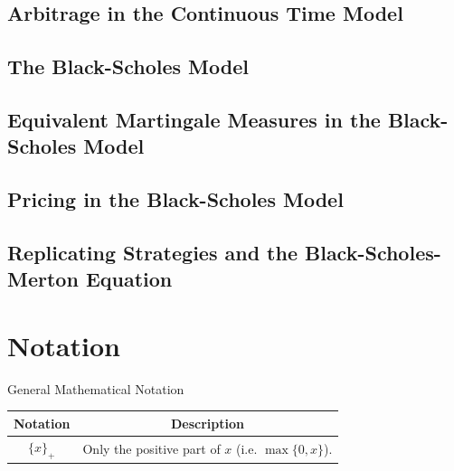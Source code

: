 \documentclass[11pt,a4paper]{article}
\begin{document}
\subsection{Arbitrage in the Continuous Time Model}

\subsection{The Black-Scholes Model}

\subsection{Equivalent Martingale Measures in the Black-Scholes Model}

\subsection{Pricing in the Black-Scholes Model}

\subsection{Replicating Strategies and the Black-Scholes-Merton Equation}

\section{Notation}

  \begin{notation}{General Mathematical Notation}
    \begin{tabular}{c|c}
      Notation&Description\\\hline
      $\{x\}_+$&Only the positive part of $x$ (i.e. $\max\{0,x\}$).
    \end{tabular}
  \end{notation}
\end{document}
